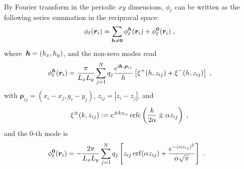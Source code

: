 \begin{lem}\label{thm::SpectralExpansion}
	By Fourier transform in the periodic $xy$ dimensions, $\phi_{\ell}$ can be written as the following series summation in the reciprocal space:
	\begin{equation}\label{eq::7} 
		\phi_{\ell}(\bm{r}_{i}) = \sum_{\boldsymbol{h} \neq \bm{0}} \phi_{\ell}^{\boldsymbol{h}}(\bm{r}_{i}) + \phi_{\ell}^{\bm{0}}(\bm{r}_{i})\;,
	\end{equation}
	where~$\boldsymbol{h} = (h_x, h_y)$, and the non-zero modes read
	\begin{equation}\label{eq:philk}
		\phi_{\ell}^{\boldsymbol{h}}(\bm{r}_{i}) = \frac{\pi}{L_x L_y} \sum_{j = 1}^N q_{j} \frac{e^{\mathrm{i} \boldsymbol{h} \cdot \boldsymbol{\rho}_{ij}}}{h} \left[\xi^{+}(h, z_{ij})+\xi^{-}(h, z_{ij})\right]\;,
	\end{equation}
	with $\bm{\rho}_{ij}=(x_{i}-x_{j},y_{i}-y_{j})$, $z_{ij}=|z_{i}-z_{j}|$, and
	\begin{equation}\label{eq::xi_def}
		\xi^{\pm}(k, z_{ij}) := e^{\pm k z_{ij}} \operatorname{erfc} \left( \frac{k}{2 \alpha} \pm \alpha z_{ij}\right)\;,
	\end{equation} 
	and the 0-th mode is
	\begin{align}\label{eq:phil0}
		\phi_{\ell}^{\bm{0}}(\bm{r}_{i}) &= -\frac{2\pi}{L_x L_y} \sum_{j = 1}^N q_{j} \left[ {z_{ij}} \operatorname{erf}(\alpha {z_{ij}}) + \frac{e^{-(\alpha z_{ij})^2}}{\alpha \sqrt{\pi}}  \right]\;.
	\end{align}
\end{lem}

